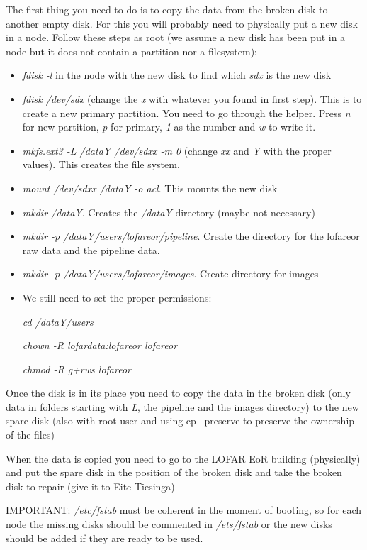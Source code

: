 \documentclass[a4paper,11pt]{article}
\begin{document}
The first thing you need to do is to copy the data from the broken disk to another empty disk. For this you will probably need to physically put a new disk in a node. Follow these steps as root (we assume a new disk has been put in a node but it does not contain a partition nor a filesystem):

\begin{itemize}
	\item \textit{fdisk -l} in the node with the new disk to find which \textit{sdx} is the new disk
	\item  \textit{fdisk /dev/sdx} (change the \textit{x} with whatever you found in first step). This is to create a new primary partition. You need to go through the helper. Press \textit{n} for new partition, \textit{p} for primary, \textit{1} as the number and \textit{w} to write it.
	\item \textit{mkfs.ext3 -L /dataY /dev/sdxx -m 0} (change \textit{xx} and \textit{Y} with the proper values). This creates the file system.
	\item \textit{mount /dev/sdxx /dataY -o acl}. This mounts the new disk
	\item \textit{mkdir /dataY}. Creates the \textit{/dataY} directory (maybe not necessary)
	\item \textit{mkdir -p /dataY/users/lofareor/pipeline}. Create the directory for the lofareor raw data and the pipeline data.
	\item \textit{mkdir -p /dataY/users/lofareor/images}. Create directory for images
	\item We still need to set the proper permissions: 
	
	\textit{cd /dataY/users}
	
	\textit{chown -R lofardata:lofareor lofareor}
	
	\textit{chmod -R g+rws lofareor}
\end{itemize}

Once the disk is in its place you need to copy the data in the broken disk (only data in folders starting with \textit{L}, the pipeline and the images directory) to the new spare disk (also with root user and using cp --preserve to preserve the ownership of the files)

When the data is copied you need to go to the LOFAR EoR building (physically) and put the spare disk in the position of the broken disk and take the broken disk to repair (give it to Eite Tiesinga)

IMPORTANT: \textit{/etc/fstab} must be coherent in the moment of booting, so for each node the missing disks should be commented in \textit{/ets/fstab} or the new disks should be added if they are ready to be used.
\end{document}
